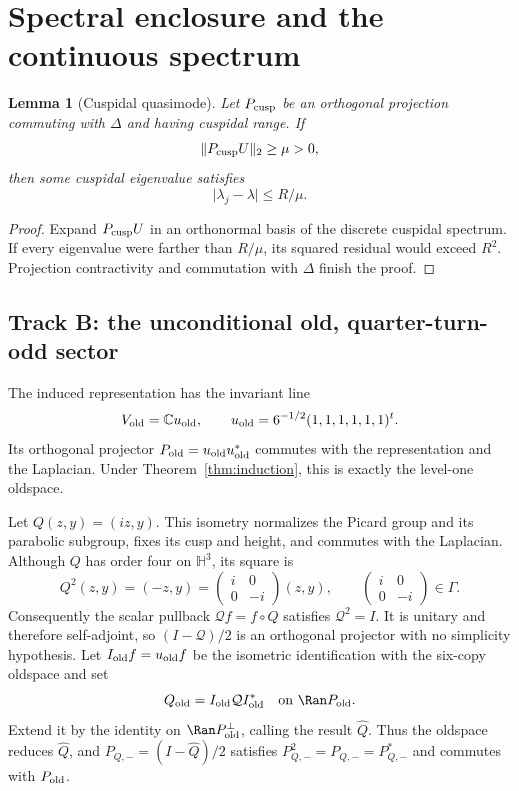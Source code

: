 \documentclass[11pt]{amsart}
\newtheorem{lemma}[theorem]{Lemma}
\theoremstyle{definition}
\newcommand{\HH}{\mathbb H^3}
\newcommand{\CC}{\mathbb C}
\newcommand{\G}{\Gamma}
\newcommand{\norm}[1]{\lVert #1\rVert}
\newcommand{\abs}[1]{\lvert #1\rvert}
\newcommand{\D}{\Delta}
\begin{document}
\section{Spectral enclosure and the continuous spectrum}

\begin{lemma}[Cuspidal quasimode]\label{lem:quasimode}
Let $P_{\rm cusp}$ be an orthogonal projection commuting with $\D$ and
having cuspidal range. If
\[
 \norm{P_{\rm cusp}U}_2\ge\mu>0,
\]
then some cuspidal eigenvalue satisfies
\begin{equation}\label{eq:eigbound}
 \abs{\lambda_j-\lambda}\le R/\mu.
\end{equation}
\end{lemma}

\begin{proof}
Expand $P_{\rm cusp}U$ in an orthonormal basis of the discrete cuspidal
spectrum. If every eigenvalue were farther than $R/\mu$, its squared
residual would exceed $R^2$. Projection contractivity and commutation with
$\D$ finish the proof.
\end{proof}

\subsection{Track B: the unconditional old, quarter-turn-odd sector}

The induced representation has the invariant line
\[
 V_{\rm old}=\CC u_{\rm old},\qquad
 u_{\rm old}=6^{-1/2}(1,1,1,1,1,1)^t.
\]
Its orthogonal projector $P_{\rm old}=u_{\rm old}u_{\rm old}^*$ commutes
with the representation and the Laplacian. Under
Theorem~\ref{thm:induction}, this is exactly the level-one oldspace.

Let $Q(z,y)=(iz,y)$. This isometry normalizes the Picard group and its
parabolic subgroup, fixes its cusp and height, and commutes with the
Laplacian. Although $Q$ has order four on $\HH$, its square is
\[
 Q^2(z,y)=(-z,y)=
 \begin{pmatrix}i&0\\0&-i\end{pmatrix}(z,y),
 \qquad
 \begin{pmatrix}i&0\\0&-i\end{pmatrix}\in\G.
\]
Consequently the scalar pullback $\mathcal Qf=f\circ Q$ satisfies
$\mathcal Q^2=I$. It is unitary and therefore self-adjoint, so
$(I-\mathcal Q)/2$ is an orthogonal projector with no simplicity hypothesis.
Let
$I_{\rm old}f=u_{\rm old}f$ be the isometric identification with the
six-copy oldspace and set
\[
 Q_{\rm old}=I_{\rm old}\mathcal QI_{\rm old}^*
 \quad\hbox{on }\Ran P_{\rm old}.
\]
Extend it by the identity on $\Ran P_{\rm old}^{\perp}$, calling the result
$\widehat Q$. Thus the oldspace reduces $\widehat Q$, and
$P_{Q,-}=(I-\widehat Q)/2$ satisfies
$P_{Q,-}^2=P_{Q,-}=P_{Q,-}^*$ and commutes with $P_{\rm old}$.
\end{document}
